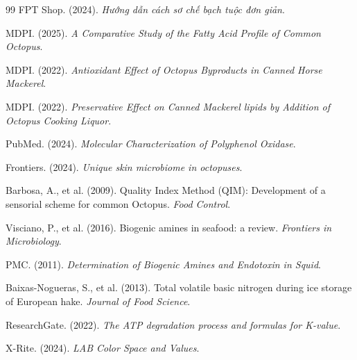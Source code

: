 \documentclass[12pt,a4paper]{report}
\begin{document}
\begin{thebibliography}{99}
 FPT Shop. (2024). \textit{Hướng dẫn cách sơ chế bạch tuộc đơn giản}.

 MDPI. (2025). \textit{A Comparative Study of the Fatty Acid Profile of Common Octopus}.

 MDPI. (2022). \textit{Antioxidant Effect of Octopus Byproducts in Canned Horse Mackerel}.

 MDPI. (2022). \textit{Preservative Effect on Canned Mackerel lipids by Addition of Octopus Cooking Liquor}.

 PubMed. (2024). \textit{Molecular Characterization of Polyphenol Oxidase}.

 Frontiers. (2024). \textit{Unique skin microbiome in octopuses}.

 Barbosa, A., et al. (2009). Quality Index Method (QIM): Development of a sensorial scheme for common Octopus. \textit{Food Control}.

 Visciano, P., et al. (2016). Biogenic amines in seafood: a review. \textit{Frontiers in Microbiology}.

 PMC. (2011). \textit{Determination of Biogenic Amines and Endotoxin in Squid}.

 Baixas-Nogueras, S., et al. (2013). Total volatile basic nitrogen during ice storage of European hake. \textit{Journal of Food Science}.

 ResearchGate. (2022). \textit{The ATP degradation process and formulas for K-value}.

 X-Rite. (2024). \textit{LAB Color Space and Values}.

\end{thebibliography}
\end{document}
